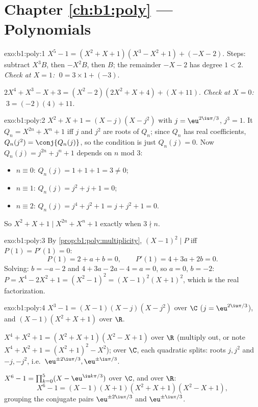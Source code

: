 \section*{Chapter \ref{ch:b1:poly} --- Polynomials}

\begin{solution}{exo:b1:poly:1}
$X^5 - 1 = (X^2 + X + 1)(X^3 - X^2 + 1) + (-X - 2)$. Steps: subtract
$X^3 B$, then $-X^2 B$, then $B$; the remainder $-X - 2$ has degree
$1 < 2$. \emph{Check at $X = 1$:} $\;0 = 3 \times 1 + (-3)$.

$2X^4 + X^3 - X + 3 = (X^2 - 2)(2X^2 + X + 4) + (X + 11)$. \emph{Check
at $X = 0$:} $\;3 = (-2)(4) + 11$.
\end{solution}

\begin{solution}{exo:b1:poly:2}
$X^2 + X + 1 = (X - j)(X - j^2)$ with $j = \eu^{2\iu\pi/3}$, $j^3 =
1$. It  $Q_n = X^{2n} + X^n + 1$ iff $j$ and $j^2$ are roots of
$Q_n$; since $Q_n$ has real coefficients, $Q_n(j^2) =
\conj{Q_n(j)}$, so the condition is just $Q_n(j) = 0$. Now $Q_n(j) =
j^{2n} + j^n + 1$ depends on $n$ mod $3$:
\begin{itemize}
  \item $n \equiv 0$: $Q_n(j) = 1 + 1 + 1 = 3 \neq 0$;
  \item $n \equiv 1$: $Q_n(j) = j^2 + j + 1 = 0$;
  \item $n \equiv 2$: $Q_n(j) = j^4 + j^2 + 1 = j + j^2 + 1 = 0$.
\end{itemize}
So $X^2 + X + 1 \mid X^{2n} + X^n + 1$ exactly when $3 \nmid n$.
\end{solution}

\begin{solution}{exo:b1:poly:3}
By \cref{prop:b1:poly:multiplicity}, $(X-1)^2 \mid P$ iff $P(1) =
P'(1) = 0$:
\[
P(1) = 2 + a + b = 0, \qquad P'(1) = 4 + 3a + 2b = 0 .
\]
Solving: $b = -a - 2$ and $4 + 3a - 2a - 4 = a = 0$, so $a = 0$, $b =
-2$: $P = X^4 - 2X^2 + 1 = (X^2 - 1)^2 = (X-1)^2 (X+1)^2$, which is
the real factorization.
\end{solution}

\begin{solution}{exo:b1:poly:4}
$X^3 - 1 = (X - 1)(X - j)(X - j^2)$ over $\C$ ($j = \eu^{2\iu\pi/3}$),
and $(X - 1)(X^2 + X + 1)$ over $\R$.

$X^4 + X^2 + 1 = (X^2 + X + 1)(X^2 - X + 1)$ over $\R$ (multiply out,
or note $X^4 + X^2 + 1 = (X^2+1)^2 - X^2$); over $\C$, each quadratic
splits: roots $j, j^2$ and $-j, -j^2$, i.e.\ $\eu^{\pm 2\iu\pi/3},
\eu^{\pm\iu\pi/3}$.

$X^6 - 1 = \prod_{k=0}^{5} (X - \eu^{\iu k\pi/3})$ over $\C$, and over
$\R$:
\[
X^6 - 1 = (X-1)(X+1)(X^2 + X + 1)(X^2 - X + 1),
\]
grouping the conjugate pairs $\eu^{\pm 2\iu\pi/3}$ and $\eu^{\pm
\iu\pi/3}$.
\end{solution}

